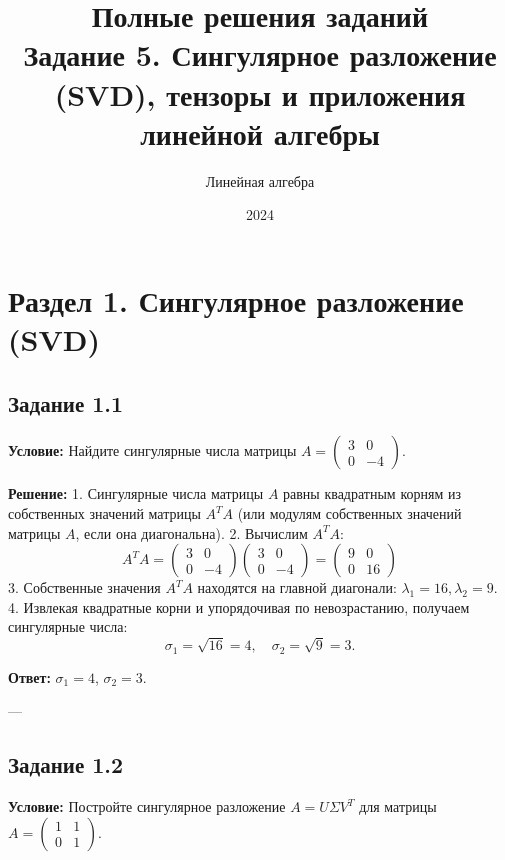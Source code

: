 \documentclass[11pt, a4paper]{article}
\title{\textbf{Полные решения заданий}\\ \large Задание 5. Сингулярное разложение (SVD), тензоры и приложения линейной алгебры}
\author{Линейная алгебра}
\date{2024}
\begin{document}
\maketitle

\section{Раздел 1. Сингулярное разложение (SVD)}

\subsection*{Задание 1.1}
\textbf{Условие:} Найдите сингулярные числа матрицы $A = \begin{pmatrix} 3 & 0 \\ 0 & -4 \end{pmatrix}$.

\textbf{Решение:}
1. Сингулярные числа матрицы $A$ равны квадратным корням из собственных значений матрицы $A^T A$ (или модулям собственных значений матрицы $A$, если она диагональна).
2. Вычислим $A^T A$:
$$ A^T A = \begin{pmatrix} 3 & 0 \\ 0 & -4 \end{pmatrix} \begin{pmatrix} 3 & 0 \\ 0 & -4 \end{pmatrix} = \begin{pmatrix} 9 & 0 \\ 0 & 16 \end{pmatrix} $$
3. Собственные значения $A^T A$ находятся на главной диагонали: $\lambda_1 = 16, \lambda_2 = 9$.
4. Извлекая квадратные корни и упорядочивая по невозрастанию, получаем сингулярные числа:
$$ \sigma_1 = \sqrt{16} = 4, \quad \sigma_2 = \sqrt{9} = 3. $$

\textbf{Ответ:} $\sigma_1 = 4$, $\sigma_2 = 3$.

---

\subsection*{Задание 1.2}
\textbf{Условие:} Постройте сингулярное разложение $A = U \Sigma V^T$ для матрицы $A = \begin{pmatrix} 1 & 1 \\ 0 & 1 \end{pmatrix}$.
\end{document}
